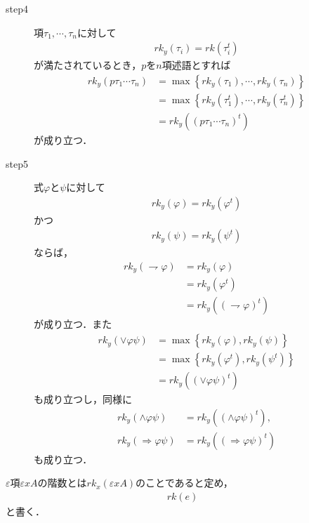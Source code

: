 \begin{metaprf}
\begin{description}
			\item[step4] 項$\tau_{1},\cdots,\tau_{n}$に対して
				\begin{align}
					rk_{y}(\tau_{i}) = rk(\tau_{i}^{t})
				\end{align}
				が満たされているとき，$p$を$n$項述語とすれば
				\begin{align}
					rk_{y}(p\tau_{1}\cdots\tau_{n})
					&= \max\left\{rk_{y}(\tau_{1}),\cdots,rk_{y}(\tau_{n})\right\} \\
					&= \max\left\{rk_{y}(\tau_{1}^{t}),\cdots,rk_{y}(\tau_{n}^{t})\right\} \\
					&= rk_{y}((p\tau_{1}\cdots\tau_{n})^{t})
				\end{align}
				が成り立つ．
					
			\item[step5]	
				式$\varphi$と$\psi$に対して
				\begin{align}
					rk_{y}(\varphi) = rk_{y}(\varphi^{t})
				\end{align}
				かつ
				\begin{align}
					rk_{y}(\psi) = rk_{y}(\psi^{t})
				\end{align}
				ならば，
				\begin{align}
					rk_{y}(\rightharpoondown \varphi) 
					&= rk_{y}(\varphi) \\
					&= rk_{y}(\varphi^{t}) \\
					&= rk_{y}((\rightharpoondown \varphi)^{t})
				\end{align}
				が成り立つ．また
				\begin{align}
					rk_{y}(\vee \varphi \psi) 
					&= \max\left\{rk_{y}(\varphi),rk_{y}(\psi)\right\} \\
					&= \max\left\{rk_{y}(\varphi^{t}),rk_{y}(\psi^{t})\right\} \\
					&= rk_{y}((\vee \varphi \psi)^{t})
				\end{align}
				も成り立つし，同様に
				\begin{align}
					rk_{y}(\wedge \varphi \psi) &= rk_{y}((\wedge \varphi \psi)^{t}), \\
					rk_{y}(\Longrightarrow \varphi \psi) &= rk_{y}((\Longrightarrow \varphi \psi)^{t})
				\end{align}
				も成り立つ．
				\QED
		\end{description}
	\end{metaprf}
	
	$\varepsilon$項$\varepsilon x A$の階数とは$rk_{x}(\varepsilon x A)$のことであると定め，
	\begin{align}
		rk(e)
	\end{align}
	と書く．
	
